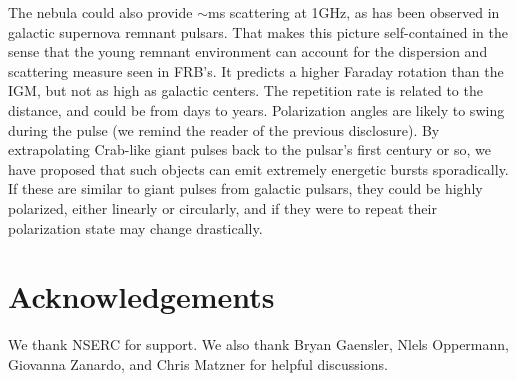 \documentclass[useAMS,usenatbib]{mn2e}
\begin{document}
The nebula could also provide $\sim$ms scattering at 1GHz, as has been 
observed in galactic supernova remnant pulsars. 
That makes this picture self-contained in the sense that
the young remnant environment can account for the dispersion 
and scattering measure seen in FRB's.  It predicts a higher Faraday
rotation than the IGM, but not as high as galactic centers.  The
repetition rate is related to the distance, and could be from days to
years.  Polarization angles are likely to swing during the pulse (we
remind the reader of the previous disclosure).
By extrapolating Crab-like giant pulses back to the pulsar's first century or so,
we have proposed that such objects can emit extremely energetic bursts sporadically. 
If these are similar to giant pulses from galactic pulsars, they could be highly polarized, 
either linearly or circularly, and if they were to repeat their polarization state may 
change drastically. 

\section{Acknowledgements}

We thank NSERC for support. We also thank Bryan Gaensler, Nlels Oppermann, 
Giovanna Zanardo, and Chris Matzner for helpful discussions. 

\newcommand{\araa}{ARA\&A}   %
\newcommand{\afz}{Afz}       %
\newcommand{\aj}{AJ}         %
\newcommand{\azh}{AZh}       %
\newcommand{\aaa}{A\&A}      %
\newcommand{\aas}{A\&AS}     %
\newcommand{\aar}{A\&AR}     %
\newcommand{\apj}{ApJ}       %
\newcommand{\apjs}{ApJS}     %
\newcommand{\apjl}{ApJ}      %
\newcommand{\apss}{Ap\&SS}   %
\newcommand{\baas}{BAAS}     %
\newcommand{\jaa}{JA\&A}     %
\newcommand{\mnras}{MNRAS}   %
\newcommand{\nat}{Nat}       %
\newcommand{\pasj}{PASJ}     %
\newcommand{\pasp}{PASP}     %
\newcommand{\paspc}{PASPC}   %
\newcommand{\qjras}{QJRAS}   %
\newcommand{\sci}{Sci}       %
\newcommand{\solphys}{Solar Physics}       %
\newcommand{\sova}{SvA}      %
\newcommand{\aap}{A\&A}
\newcommand\jcap{{J. Cosmology Astropart. Phys.}}%
\newcommand{\prd}{Phys. Rev. D}

%




\label{lastpage}
\end{document}
